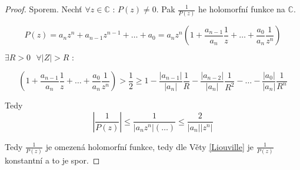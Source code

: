 \begin{proof}
Sporem. Nechť $\forall z \in \mathbb{C} \textrm{ : } P(z) \neq 0$. Pak $\frac{1}{P(z)}$ he holomorfní funkce na $\mathbb{C}$.

$$P(z) = a_n z^n + a_{n-1} z^{n-1} + \ldots + a_0 = a_n z^n \left( 1 + \frac{a_{n-1}}{a_n} \frac{1}{z} + \ldots + \frac{a_0}{a_n} \frac{1}{z^n} \right)$$

$\exists R > 0 \textrm{ } \forall |Z| > R \textrm{ : }$

$$\left( 1 + \frac{a_{n-1}}{a_n} \frac{1}{z} + \ldots + \frac{a_0}{a_n} \frac{1}{z^n} \right) > \frac{1}{2} \geq 1 - \frac{|a_{n-1}|}{|a_n|} \frac{1}{R} - \frac{|a_{n-2}|}{|a_n|} \frac{1}{R^2} - \ldots - \frac{|a_0|}{|a_n|} \frac{1}{R^n}$$

Tedy 
$$\left| \frac{1}{P(z)} \right| \leq \frac{1}{|a_n z^n| (\ldots)} \leq \frac{2}{|a_n| |z^n|}$$

Tedy $\frac{1}{P(z)}$ je omezená holomorfní funkce, tedy dle Věty \ref{Liouville} je $\frac{1}{P(z)}$ konstantní a to je spor.
\end{proof}
